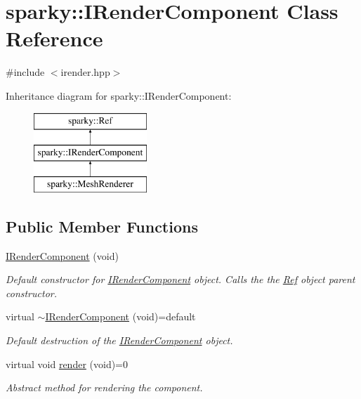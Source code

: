 \hypertarget{classsparky_1_1_i_render_component}{}\section{sparky\+:\+:I\+Render\+Component Class Reference}
\label{classsparky_1_1_i_render_component}


{\ttfamily \#include $<$irender.\+hpp$>$}

Inheritance diagram for sparky\+:\+:I\+Render\+Component\+:\begin{figure}[H]
\begin{center}
\leavevmode
\includegraphics[height=3.000000cm]{classsparky_1_1_i_render_component}
\end{center}
\end{figure}
\subsection*{Public Member Functions}
\begin{DoxyCompactItemize}
\item 
\hyperlink{classsparky_1_1_i_render_component_ab0f41c5fff4cf560544edc0aedf5fdf3}{I\+Render\+Component} (void)\hypertarget{classsparky_1_1_i_render_component_ab0f41c5fff4cf560544edc0aedf5fdf3}{}\label{classsparky_1_1_i_render_component_ab0f41c5fff4cf560544edc0aedf5fdf3}

\begin{DoxyCompactList}\small\item\em Default constructor for \hyperlink{classsparky_1_1_i_render_component}{I\+Render\+Component} object. Calls the the \hyperlink{classsparky_1_1_ref}{Ref} object parent constructor. \end{DoxyCompactList}\item 
virtual \hyperlink{classsparky_1_1_i_render_component_aafee7ed8a4c86d5f6e3a07da0863ab12}{$\sim$\+I\+Render\+Component} (void)=default\hypertarget{classsparky_1_1_i_render_component_aafee7ed8a4c86d5f6e3a07da0863ab12}{}\label{classsparky_1_1_i_render_component_aafee7ed8a4c86d5f6e3a07da0863ab12}

\begin{DoxyCompactList}\small\item\em Default destruction of the \hyperlink{classsparky_1_1_i_render_component}{I\+Render\+Component} object. \end{DoxyCompactList}\item 
virtual void \hyperlink{classsparky_1_1_i_render_component_adb6a10d473124fcc807d5d61b6e5ebf1}{render} (void)=0
\begin{DoxyCompactList}\small\item\em Abstract method for rendering the component. \end{DoxyCompactList}\end{DoxyCompactItemize}
